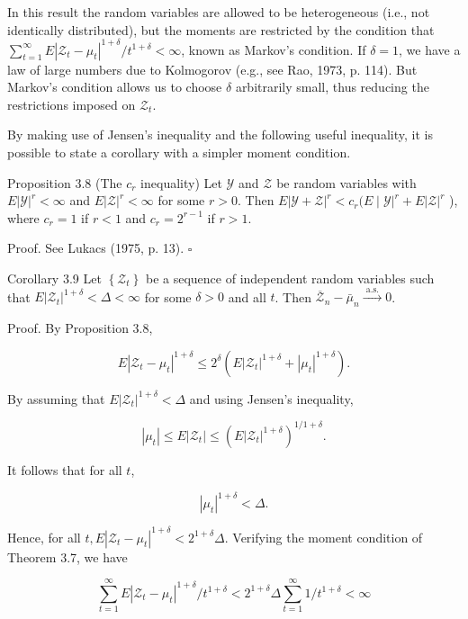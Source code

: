 \documentclass[10pt]{article}
\begin{document}
In this result the random variables are allowed to be heterogeneous (i.e., not identically distributed), but the moments are restricted by the condition that $\sum_{t=1}^{\infty} E\left|\mathcal{Z}_{t}-\mu_{t}\right|^{1+\delta} / t^{1+\delta}<\infty$, known as Markov's condition. If $\delta=1$, we have a law of large numbers due to Kolmogorov (e.g., see Rao, 1973, p. 114). But Markov's condition allows us to choose $\delta$ arbitrarily small, thus reducing the restrictions imposed on $\mathcal{Z}_{t}$.

By making use of Jensen's inequality and the following useful inequality, it is possible to state a corollary with a simpler moment condition.

Proposition 3.8 (The $c_{r}$ inequality) Let $\mathcal{Y}$ and $\mathcal{Z}$ be random variables with $E|\mathcal{Y}|^{r}<\infty$ and $E|\mathcal{Z}|^{r}<\infty$ for some $r>0$. Then $E|\mathcal{Y}+\mathcal{Z}|^{r}<c_{r}(E \mid \mathcal{Y} \left.\right|^{r}+E|\mathcal{Z}|^{r}$ ), where $c_{r}=1$ if $r<1$ and $c_{r}=2^{r-1}$ if $r>1$.

Proof. See Lukacs (1975, p. 13). \(\square\)

Corollary 3.9 Let $\left\{\mathcal{Z}_{t}\right\}$ be a sequence of independent random variables such that $E\left|\mathcal{Z}_{t}\right|^{1+\delta}<\Delta<\infty$ for some $\delta>0$ and all $t$. Then $\overline{\mathcal{Z}}_{n}-\bar{\mu}_{n} \xrightarrow{\text { a.s. }} 0$.

Proof. By Proposition 3.8,

$$
E\left|\mathcal{Z}_{t}-\mu_{t}\right|^{1+\delta} \leq 2^{\delta}\left(E\left|\mathcal{Z}_{t}\right|^{1+\delta}+\left|\mu_{t}\right|^{1+\delta}\right) .
$$

By assuming that $E\left|\mathcal{Z}_{t}\right|^{1+\delta}<\Delta$ and using Jensen's inequality,

$$
\left|\mu_{t}\right| \leq E\left|\mathcal{Z}_{t}\right| \leq\left(E\left|\mathcal{Z}_{t}\right|^{1+\delta}\right)^{1 / 1+\delta} .
$$

It follows that for all $t$,

$$
\left|\mu_{t}\right|^{1+\delta}<\Delta .
$$

Hence, for all $t, E\left|\mathcal{Z}_{t}-\mu_{t}\right|^{1+\delta}<2^{1+\delta} \Delta$. Verifying the moment condition of Theorem 3.7, we have

$$
\sum_{t=1}^{\infty} E\left|\mathcal{Z}_{t}-\mu_{t}\right|^{1+\delta} / t^{1+\delta}<2^{1+\delta} \Delta \sum_{t=1}^{\infty} 1 / t^{1+\delta}<\infty
$$
\end{document}
